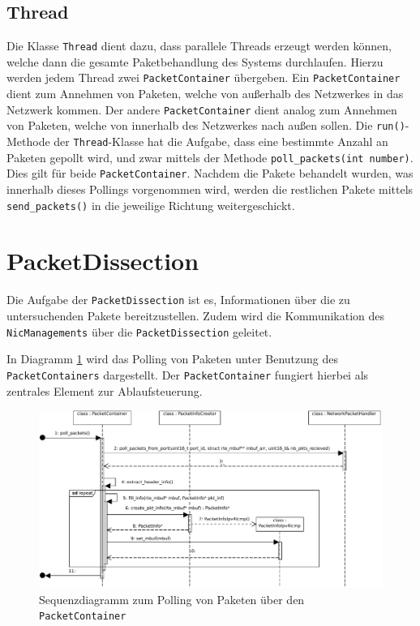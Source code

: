 \documentclass[../review_2.tex]{subfiles}
\begin{document}
\subsection{Thread}
Die Klasse \texttt{Thread} dient dazu, dass parallele Threads erzeugt werden können, welche dann die gesamte Paketbehandlung des Systems durchlaufen. Hierzu werden jedem Thread zwei \texttt{PacketContainer} übergeben. Ein \texttt{PacketContainer} dient zum Annehmen von Paketen, welche von außerhalb des Netzwerkes in das Netzwerk kommen. Der andere \texttt{PacketContainer} dient analog zum Annehmen von Paketen, welche von innerhalb des Netzwerkes nach außen sollen. Die \texttt{run()}-Methode der \texttt{Thread}-Klasse hat die Aufgabe, dass eine bestimmte Anzahl an Paketen gepollt wird, und zwar mittels der Methode \texttt{poll\_packets(int number)}. Dies gilt für beide \texttt{PacketContainer}. Nachdem die Pakete behandelt wurden, was innerhalb dieses Pollings vorgenommen wird, werden die restlichen Pakete mittels \texttt{send\_packets()} in die jeweilige Richtung weitergeschickt.

\section{PacketDissection}
Die Aufgabe der \texttt{PacketDissection} ist es, Informationen über die zu untersuchenden Pakete bereitzustellen. Zudem wird die Kommunikation des \texttt{NicManagements} über die \texttt{PacketDissection} geleitet.

In Diagramm \ref{Sequenzdiagramm_PacketDissection} wird das Polling von Paketen unter Benutzung des \texttt{PacketContainers} dargestellt. Der \texttt{PacketContainer} fungiert hierbei als zentrales Element zur Ablaufsteuerung.

\begin{figure}
	\centering
	\includegraphics[width=\linewidth]{img/SequenceDiagramPacketDissection2.pdf}
	\caption{Sequenzdiagramm zum Polling von Paketen über den \texttt{PacketContainer}}
	\label{Sequenzdiagramm_PacketDissection}
\end{figure}
\end{document}
